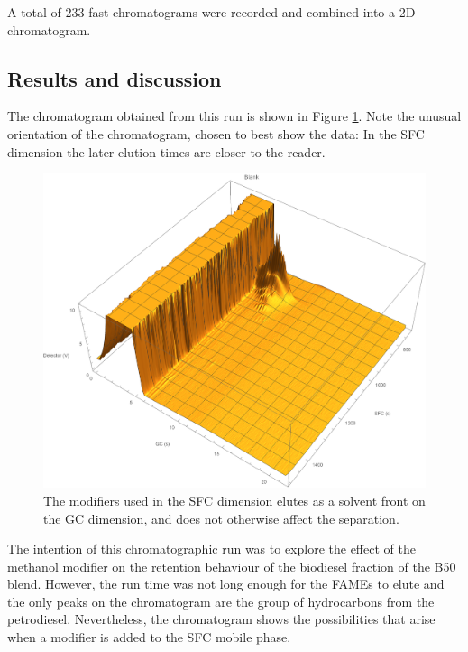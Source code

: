 A total of 233 fast chromatograms were recorded and combined into a 2D
chromatogram.

\subsection{Results and discussion}

The chromatogram obtained from this run is shown in Figure \ref{fig:Modifier}.
Note the unusual orientation of the chromatogram, chosen to best show the data:
In the SFC dimension the later elution times are closer to the reader.

\begin{figure}
	\centering
	\includegraphics[width=\textwidth]{Figures/Modifier.pdf}
	\decoRule	
	
	\caption[Modifiers in SFC]{The modifiers used in the SFC dimension elutes as a
solvent front on the GC dimension, and does not otherwise affect the separation.}
	
	\label{fig:Modifier} 
\end{figure}

The intention of this chromatographic run was to explore the effect of the
meth\-anol modifier on the retention behaviour of the biodiesel fraction of the
B50 blend. However, the run time was not long enough for the FAMEs to elute and
the only peaks on the chromatogram are the group of hydrocarbons from the
petrodiesel. Nevertheless, the chromatogram shows the possibilities that arise
when a modifier is added to the SFC mobile phase.

